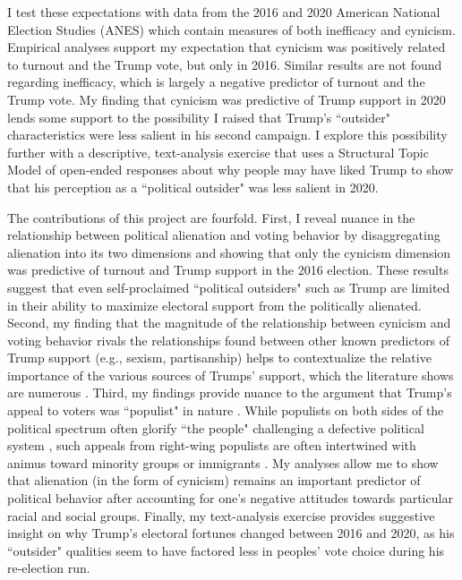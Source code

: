 \documentclass[12pt]{article}
\begin{document}
I test these expectations with data from the 2016 and 2020 American National Election Studies (ANES) which contain measures of both inefficacy and cynicism. Empirical analyses support my expectation that cynicism was positively related to turnout and the Trump vote, but only in 2016. Similar results are not found regarding inefficacy, which is largely a negative predictor of turnout and the Trump vote. My finding that cynicism was predictive of Trump support in 2020 lends some support to the possibility I raised that Trump's ``outsider" characteristics were less salient in his second campaign. I explore this possibility further with a descriptive, text-analysis exercise that uses a Structural Topic Model of open-ended responses about why people may have liked Trump to show that his perception as a ``political outsider" was less salient in 2020. 

The contributions of this project are fourfold. First, I reveal nuance in the relationship between political alienation and voting behavior by disaggregating alienation into its two dimensions and showing that only the cynicism dimension was predictive of turnout and Trump support in the 2016 election. These results suggest that even self-proclaimed ``political outsiders" such as Trump are limited in their ability to maximize electoral support from the politically alienated. Second, my finding that the magnitude of the relationship between cynicism and voting behavior rivals the relationships found between other known predictors of Trump support (e.g., sexism, partisanship) helps to contextualize the relative importance of the various sources of Trumps' support, which the literature shows are numerous \parencite{enders2021modeling}. Third, my findings provide nuance to the argument that Trump's appeal to voters was ``populist" in nature \parencite{brewer2016populism,inglehart2017trump}. While populists on both sides of the political spectrum often glorify ``the people" challenging a defective political system \parencite{mudde2004populist}, such appeals from right-wing populists are often intertwined with animus toward minority groups or immigrants \parencite{lacatus2019populism}. My analyses allow me to show that alienation (in the form of cynicism) remains an important predictor of political behavior after accounting for one's negative attitudes towards particular racial and social groups. Finally, my text-analysis exercise provides suggestive insight on why Trump's electoral fortunes changed between 2016 and 2020, as his ``outsider" qualities seem to have factored less in peoples' vote choice during his re-election run. 
\end{document}

